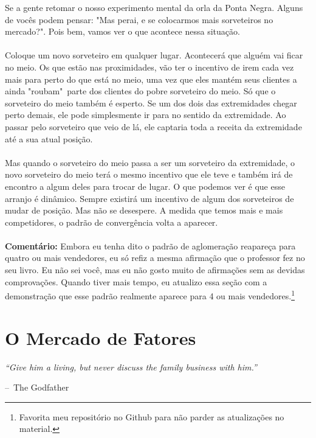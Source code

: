 \documentclass[a4paper,11pt,oneside]{book}
\makeatletter
\theoremstyle{definition}
\theoremstyle{break}
\newenvironment{chapquote}[2][2em]
  {\setlength{\@tempdima}{#1}%
   \def\chapquote@author{#2}%
   \parshape 1 \@tempdima \dimexpr\textwidth-2\@tempdima\relax%
   \itshape}
  {\par\normalfont\hfill--\ \chapquote@author\hspace*{\@tempdima}\par\bigskip}
\makeatother
\begin{document}
Se a gente retomar o nosso experimento mental da orla da Ponta Negra. Alguns de vocês podem pensar: "Mas perai, e se colocarmos mais sorveteiros no mercado?". Pois bem, vamos ver o que acontece nessa situação.
\\~\\
Coloque um novo sorveteiro em qualquer lugar. Acontecerá que alguém vai ficar no meio. Os que estão nas proximidades, vão ter o incentivo de irem cada vez mais para perto do que está no meio, uma vez que eles mantém seus clientes a ainda "roubam"\ parte dos clientes do pobre sorveteiro do meio. Só que o sorveteiro do meio também é esperto. Se um dos dois das extremidades chegar perto demais, ele pode simplesmente ir para no sentido da extremidade. Ao passar pelo sorveteiro que veio de lá, ele captaria toda a receita da extremidade até a sua atual posição.
\\~\\
Mas quando o sorveteiro do meio passa a ser um sorveteiro da extremidade, o novo sorveteiro do meio terá o mesmo incentivo que ele teve e também irá de encontro a algum deles para trocar de lugar. O que podemos ver é que esse arranjo é dinâmico. Sempre existirá um incentivo de algum dos sorveteiros de mudar de posição. Mas não se desespere. A medida que temos mais e mais competidores, o padrão de convergência volta a aparecer.
\\~\\
\textbf{Comentário:} Embora eu tenha dito o padrão de aglomeração reapareça para quatro ou mais vendedores, eu só refiz a mesma afirmação que o professor fez no seu livro. Eu não sei você, mas eu não gosto muito de afirmações sem as devidas comprovações. Quando tiver mais tempo, eu atualizo essa seção com a demonstração que esse padrão realmente aparece para 4 ou mais vendedores.\footnote{Favorita meu repositório no Github para não parder as atualizações no material.}

\chapter{O Mercado de Fatores}

\begin{chapquote}{The Godfather}
	``Give him a living, but never discuss the family business with him.''
\end{chapquote}
\end{document}
